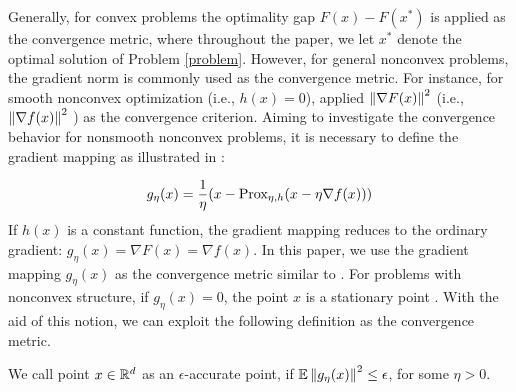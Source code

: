 Generally, for convex problems the optimality gap $F(x) - F(x^*)$ is applied as the convergence metric, where throughout the paper, we let $x^*$ denote the optimal solution of Problem \eqref{problem}. However, for general nonconvex problems, the gradient norm is commonly used as the convergence metric. For instance, for smooth nonconvex optimization (i.e., $h(x) = 0$), \cite{ghadimi2013stochastic,reddi2016stochastic,lei2017non,liu2018zeroth}  applied $\left\lVert\nabla F(x)\right\rVert^2$ (i.e., $\left\lVert\nabla f(x)\right\rVert^2$ ) as the convergence criterion. Aiming to investigate the
convergence behavior for nonsmooth nonconvex problems, it is necessary to define the gradient mapping as illustrated in \cite{ghadimi2016accelerated,reddi2016proximal,huang2019faster}:

\begin{equation}
g_{\eta}(x) = \frac{1}{\eta}(x-\text{Prox}_{\eta,h}(x-\eta \nabla f(x)))
\end{equation}
If $h(x)$ is a constant function, the gradient mapping reduces to the ordinary gradient:
$g_{\eta}(x) = \nabla F(x) = \nabla f(x)$. In this paper, we use the gradient mapping $g_{\eta}(x)$ as the convergence metric similar to
\cite{ghadimi2016accelerated,reddi2016proximal,parikh2014proximal}.
For problems with nonconvex structure, if $g_{\eta}(x) = 0$, the point $x$ is a stationary point \cite{parikh2014proximal}. With the aid of this notion, we can
exploit the following definition as the convergence metric.
\begin{definition}
We call point $x\in \mathbb{R}^d$ as an $\epsilon$-accurate point, if $\mathbb{E}\left\lVert g_{\eta}(x)\right\rVert^2 \leq \epsilon$, for some $\eta > 0$.
\end{definition}

